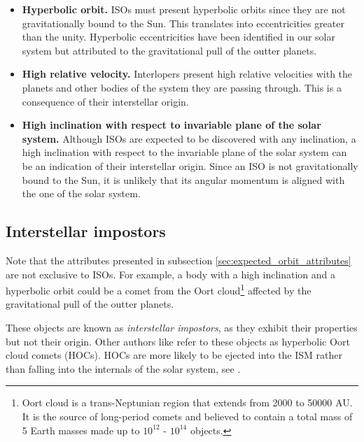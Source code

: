 \begin{itemize}
    \item \textbf{Hyperbolic orbit.} ISOs must present hyperbolic orbits since
        they are not gravitationally bound to the Sun. This translates into
        eccentricities greater than the unity. Hyperbolic eccentricities have
        been identified in our solar system but attributed to the gravitational
        pull of the outter planets.
    \item \textbf{High relative velocity.} Interlopers present high relative
        velocities with the planets and other bodies of the system they are
        passing through. This is a consequence of their interstellar origin.
    \item \textbf{High inclination with respect to invariable plane of the solar
        system.} Although ISOs are expected to be discovered with any
        inclination, a high inclination with respect to the invariable plane of
        the solar system can be an indication of their interstellar origin.
        Since an ISO is not gravitationally bound to the Sun, it is unlikely
        that its angular momentum is aligned with the one of the solar system.
\end{itemize}

\subsection{Interstellar impostors}

Note that the attributes presented in subsection
\ref{sec:expected_orbit_attributes} are not exclusive to ISOs. For example, a
body with a high inclination and a hyperbolic orbit could be a comet from the
Oort cloud\footnote{ Oort cloud is a trans-Neptunian region that extends from
2000 to 50000 AU. It is the source of long-period comets and believed to contain
a total mass of 5 Earth masses made up to $10^{12}$ - $10^{14}$ objects. }
affected by the gravitational pull of the outter planets.

These objects are known as \textit{interstellar impostors}, as they exhibit
their properties but not their origin. Other authors like \cite{higuchi2020}
refer to these objects as hyperbolic Oort cloud comets (HOCs). HOCs are more
likely to be ejected into the ISM rather than falling into the internals of the
solar system, see \cite{francis2005}.

